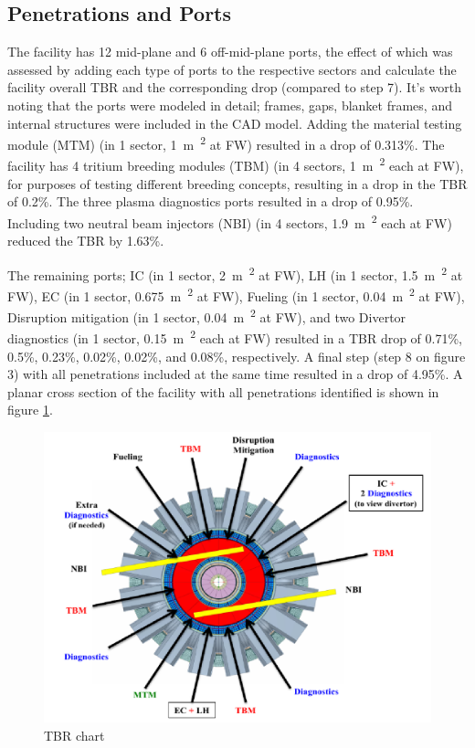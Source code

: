 \documentclass[12pt, letterpaper]{elsarticle}
\begin{document}
\subsection{Penetrations and Ports} \label{Penetrations and Ports}
The facility has 12 mid-plane and 6 off-mid-plane ports, the effect of which was assessed by adding each type of ports to the respective sectors and calculate the facility overall TBR and the corresponding drop (compared to step 7). It's worth noting that the ports were modeled in detail; frames, gaps, blanket frames, and internal structures were included in the CAD model. Adding the material testing module (MTM) (in 1 sector, \SI{1}{m\textsuperscript{2}} at FW) resulted in a drop of 0.313\%. The facility has 4 tritium breeding modules (TBM) (in 4 sectors, \SI{1}{m\textsuperscript{2}} each at FW), for purposes of testing different breeding concepts, resulting in a drop in the TBR of 0.2\%. The three plasma diagnostics ports resulted in a drop of 0.95\%. Including two neutral beam injectors (NBI) (in 4 sectors, \SI{1.9}{m\textsuperscript{2}} each at FW) reduced the TBR by 1.63\%. \vspace{5mm}

The remaining ports; IC (in 1 sector, \SI{2}{m\textsuperscript{2}} at FW), LH (in 1 sector, \SI{1.5}{m\textsuperscript{2}} at FW), EC (in 1 sector, \SI{0.675}{m\textsuperscript{2}} at FW), Fueling (in 1 sector, \SI{0.04}{m\textsuperscript{2}} at FW), Disruption mitigation (in 1 sector, \SI{0.04}{m\textsuperscript{2}} at FW), and two Divertor diagnostics (in 1 sector, \SI{0.15}{m\textsuperscript{2}} each at FW) resulted in a TBR drop of 0.71\%, 0.5\%, 0.23\%, 0.02\%, 0.02\%, and 0.08\%, respectively. A final step (step 8 on figure 3) with all penetrations included at the same time resulted in a drop of 4.95\%. A planar cross section of the facility with all penetrations identified is shown in figure \ref{fig:Ports}.
\begin{figure}[h!]
  \centering
  \includegraphics[scale=0.3]{../plots/ports.png}
  \caption{TBR chart}
  \label{fig:Ports}
\end{figure}
\end{document}
